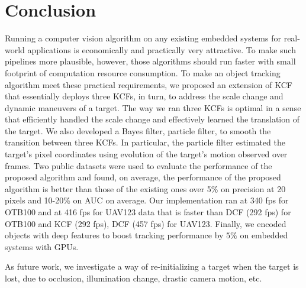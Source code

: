 \documentclass[10pt,twocolumn,letterpaper]{article}
\begin{document}

\section{Conclusion} \label{sc:Conclusion}
Running a computer vision algorithm on any existing embedded systems
for real-world applications is economically and practically very
attractive. To make such pipelines more plausible, however, those
algorithms should run faster with small footprint of computation
resource consumption. To make an object tracking algorithm meet these
practical requirements, we proposed an extension of KCF that
essentially deploys three KCFs, in turn, to address the scale change
and dynamic maneuvers of a target. The way we ran three KCFs is
optimal in a sense that efficiently handled the scale change and
effectively learned the translation of the target. We also developed a
Bayes filter, particle filter, to smooth the transition between three
KCFs. In particular, the particle filter estimated the target’s pixel 
coordinates using evolution of the target’s motion observed over frames.
Two public datasets were used to evaluate the performance of the
proposed algorithm and found, on average, the performance of the
proposed algorithm is better than those of the existing ones over 5\%
on precision at 20 pixels and 10-20\% on AUC on average. Our
implementation ran at 340 fps for OTB100 and at 416 fps for UAV123
data that is faster than DCF (292 fps) for OTB100 and KCF (292 fps),
DCF (457 fps) for UAV123. Finally, we encoded objects with deep
features to boost tracking performance by $5\%$ on embedded systems
with GPUs.

As future work, we investigate a way of re-initializing a target when
the target is lost, due to occlusion, illumination change, drastic
camera motion, etc.

{\small


}
\end{document}
